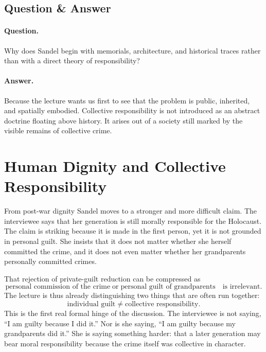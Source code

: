 \subsection{Question \& Answer}

\paragraph{Question.} Why does Sandel begin with memorials, architecture, and historical traces rather than with a direct theory of responsibility?

\paragraph{Answer.} Because the lecture wants us first to see that the problem is public, inherited, and spatially embodied. Collective responsibility is not introduced as an abstract doctrine floating above history. It arises out of a society still marked by the visible remains of collective crime.

\section{Human Dignity and Collective Responsibility}

From post-war dignity Sandel moves to a stronger and more difficult claim. The interviewee says that her generation is still morally responsible for the Holocaust. The claim is striking because it is made in the first person, yet it is not grounded in personal guilt. She insists that it does not matter whether she herself committed the crime, and it does not even matter whether her grandparents personally committed crimes.

That rejection of private-guilt reduction can be compressed as
\begin{equation}
\text{personal commission of the crime}
\;\text{or}\;
\text{personal guilt of grandparents}
\quad \text{is irrelevant}.
\end{equation}
The lecture is thus already distinguishing two things that are often run together:
\begin{equation}
\text{individual guilt}
\neq
\text{collective responsibility}.
\end{equation}
This is the first real formal hinge of the discussion. The interviewee is not saying, ``I am guilty because I did it.'' Nor is she saying, ``I am guilty because my grandparents did it.'' She is saying something harder: that a later generation may bear moral responsibility because the crime itself was collective in character.

